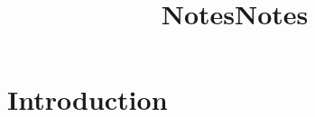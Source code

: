 \documentclass{article}
\title{Notes}
\title{Notes}
\author{}
\begin{document}
\maketitle

\section{Introduction}
\end{document}
